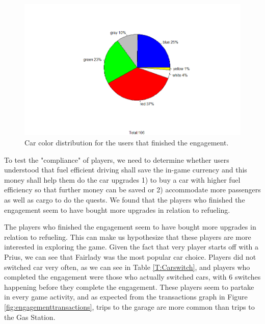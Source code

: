 \documentclass[preprint,authoryear,12pt]{elsarticle}
\begin{document}
\begin{figure}[htb]
	\begin{center}
		\includegraphics[width=.95\linewidth]{ijhcs14-img/Color}
		\caption{Car color distribution for the users that finished the engagement.\label{fig:engagementcolor}}
	\end{center}
\end{figure}


To test the "compliance" of players, we need to determine whether users understood  that fuel efficient driving shall save the in-game currency and this money shall help them do the car upgrades 1) to buy a car with higher fuel efficiency so that further money can be saved or 2) accommodate more passengers as well as cargo to do the quests.  We found that the players who finished the engagement seem to have bought more upgrades in relation to refueling. 


The players who finished the engagement seem to have bought more upgrades in relation to refueling. This can make us hypothesize that these players are more interested in exploring the game.
Given the fact that very player starts off with a Prius, we can see that Fairlady was the most popular car choice. Players did not switched car very often, as we can see in Table \ref{T:Carswitch}, and players who completed the engagement were those who actually switched cars, with 6 switches happening before they complete the engagement. 
These players seem to partake in every game activity, and as expected from the transactions graph in Figure \ref{fig:engagementtransactions}, trips to the garage are more common than trips to the Gas Station.
\end{document}

